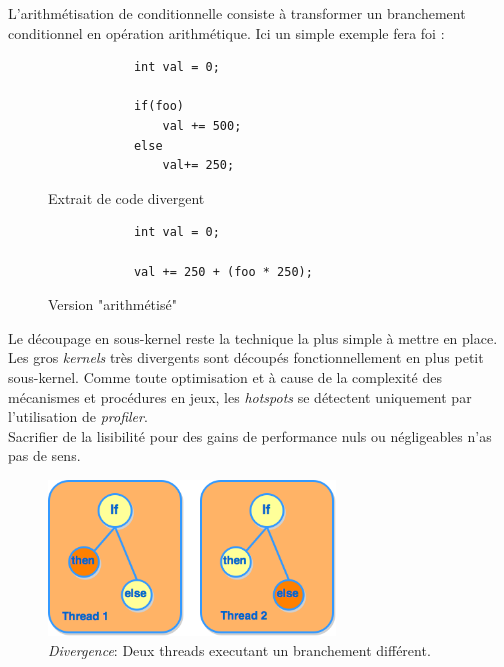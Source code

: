 \documentclass[french, 11pt]{memoir}
\begin{document}
\bigskip
L'arithmétisation de conditionnelle consiste à transformer un
branchement conditionnel en opération arithmétique. Ici un simple
exemple fera foi :

    \begin{figure}[ht]
    	\begin{minipage}[b]{0.5\linewidth}
    		\centering
    		\begin{verbatim}
    		int val = 0;
    		
    		if(foo)
    		    val += 500;
    		else
    		    val+= 250;
    		\end{verbatim}
    		\caption{Extrait de code divergent}
    	\end{minipage}
    	\hspace{0.5cm}
    	\begin{minipage}[b]{0.5\linewidth}
    		\centering
    		\begin{verbatim}
    		int val = 0;
    		
    		val += 250 + (foo * 250);
    		\end{verbatim}
    		\caption{Version "arithmétisé"}
    	\end{minipage}
    \end{figure}

\bigskip
Le découpage en sous-kernel reste la technique la plus simple à mettre
en place. \\
Les gros \emph{kernels} très divergents sont découpés fonctionnellement
en plus petit sous-kernel. Comme toute optimisation et à cause de la
complexité des mécanismes et procédures en jeux, les \emph{hotspots} se
détectent uniquement par l'utilisation de \emph{profiler}. \\
Sacrifier de
la lisibilité pour des gains de performance nuls ou négligeables n'as
pas de sens.

\begin{figure}[htbp]
	\begin{center}
		\includegraphics[width=3in]{img/divergence.png}
		\caption{\textit{Divergence}: Deux threads executant un branchement différent.}
	\end{center}
\end{figure}
\end{document}
